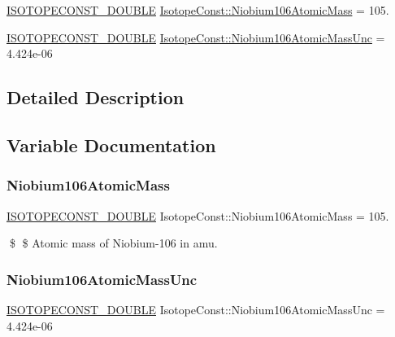 \begin{DoxyCompactItemize}
\item 
\mbox{\hyperlink{group___isotope_const-_macros_ga8f45a7272ce02c0b4c65c44636ed719a}{I\+S\+O\+T\+O\+P\+E\+C\+O\+N\+S\+T\+\_\+\+D\+O\+U\+B\+LE}} \mbox{\hyperlink{group___isotope_const-_niobium-_nb106_ga1235970ef2125e9f58907df60e69efeb}{Isotope\+Const\+::\+Niobium106\+Atomic\+Mass}} = 105.
\item 
\mbox{\hyperlink{group___isotope_const-_macros_ga8f45a7272ce02c0b4c65c44636ed719a}{I\+S\+O\+T\+O\+P\+E\+C\+O\+N\+S\+T\+\_\+\+D\+O\+U\+B\+LE}} \mbox{\hyperlink{group___isotope_const-_niobium-_nb106_gac00b99abfa546f4a36021c8a85a1d0ad}{Isotope\+Const\+::\+Niobium106\+Atomic\+Mass\+Unc}} = 4.\+424e-\/06
\end{DoxyCompactItemize}


\subsection{Detailed Description}


\subsection{Variable Documentation}
\mbox{\label{group___isotope_const-_niobium-_nb106_ga1235970ef2125e9f58907df60e69efeb}} 
\subsubsection{\texorpdfstring{Niobium106\+Atomic\+Mass}{Niobium106AtomicMass}}
{\footnotesize\ttfamily \mbox{\hyperlink{group___isotope_const-_macros_ga8f45a7272ce02c0b4c65c44636ed719a}{I\+S\+O\+T\+O\+P\+E\+C\+O\+N\+S\+T\+\_\+\+D\+O\+U\+B\+LE}} Isotope\+Const\+::\+Niobium106\+Atomic\+Mass = 105.}

\$ \$ Atomic mass of Niobium-\/106 in amu. \mbox{\label{group___isotope_const-_niobium-_nb106_gac00b99abfa546f4a36021c8a85a1d0ad}} 
\subsubsection{\texorpdfstring{Niobium106\+Atomic\+Mass\+Unc}{Niobium106AtomicMassUnc}}
{\footnotesize\ttfamily \mbox{\hyperlink{group___isotope_const-_macros_ga8f45a7272ce02c0b4c65c44636ed719a}{I\+S\+O\+T\+O\+P\+E\+C\+O\+N\+S\+T\+\_\+\+D\+O\+U\+B\+LE}} Isotope\+Const\+::\+Niobium106\+Atomic\+Mass\+Unc = 4.\+424e-\/06}

